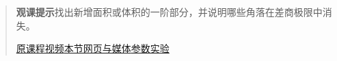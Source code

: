 \begin{quote}\small\textbf{观课提示}\quad 找出新增面积或体积的一阶部分，并说明哪些角落在差商极限中消失。

\href{https://www.youtube.com/watch?v=S0_qX4VJhMQ}{原课程视频}\quad\href{https://vitael04213.github.io/3blue1brown-notes/lessons/derivatives-power-rule.html}{本节网页与媒体}\quad\href{https://vitael04213.github.io/3blue1brown-notes/lab.html\#derivative}{参数实验}
\end{quote}
